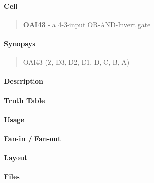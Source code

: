 \label{OAI43}
\paragraph{Cell}
\begin{quote}
    \textbf{OAI43} - a 4-3-input OR-AND-Invert gate
\end{quote}

\paragraph{Synopsys}
\begin{quote}
    OAI43 (Z, D3, D2, D1, D, C, B, A)
\end{quote}

\paragraph{Description}

%

\paragraph{Truth Table}
%

\paragraph{Usage}

\paragraph{Fan-in / Fan-out}

\paragraph{Layout}

\paragraph{Files}
